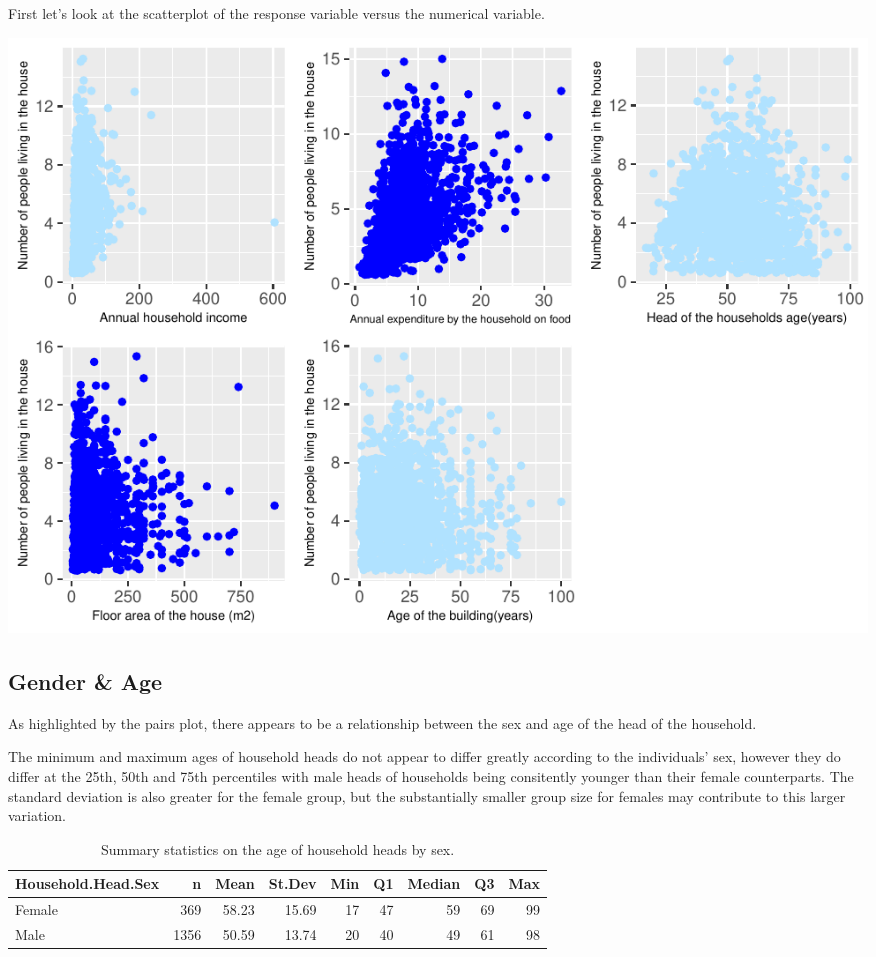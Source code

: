 \documentclass[
]{article}
\begin{document}
First let's look at the scatterplot of the response variable versus the
numerical variable.

\begin{center}\includegraphics[width=1\linewidth]{Group_01_Project2_demo_files/figure-latex/unnamed-chunk-1-1} \end{center}

\hypertarget{gender-age}{%
\subsection{Gender \& Age}\label{gender-age}}

As highlighted by the pairs plot, there appears to be a relationship
between the sex and age of the head of the household.

The minimum and maximum ages of household heads do not appear to differ
greatly according to the individuals' sex, however they do differ at the
25th, 50th and 75th percentiles with male heads of households being
consitently younger than their female counterparts. The standard
deviation is also greater for the female group, but the substantially
smaller group size for females may contribute to this larger variation.

\begin{table}[!h]

\caption{\label{tab:summaries of age by sex}Summary statistics on the age of household heads by sex.}
\centering
\begin{tabular}[t]{l|r|r|r|r|r|r|r|r}
\hline
Household.Head.Sex & n & Mean & St.Dev & Min & Q1 & Median & Q3 & Max\\
\hline
Female & 369 & 58.23 & 15.69 & 17 & 47 & 59 & 69 & 99\\
\hline
Male & 1356 & 50.59 & 13.74 & 20 & 40 & 49 & 61 & 98\\
\hline
\end{tabular}
\end{table}
\end{document}
